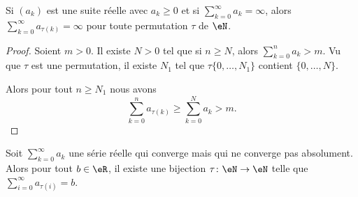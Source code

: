 \begin{proposition}	\label{PROPooVVHKooZjXQiP}
	Si \( (a_k)\) est une suite réelle avec \( a_k\geq 0\) et si \( \sum_{k=0}^{\infty}a_k=\infty\), alors \( \sum_{k=0}^{\infty}a_{\tau(k)}=\infty\) pour toute permutation \( \tau\) de \( \eN\).
\end{proposition}

\begin{proof}
	Soient \( m>0\). Il existe \( N>0\) tel que si \( n\geq N\), alors \( \sum_{k=0}^na_k>m\). Vu que \( \tau\) est une permutation, il existe \( N_1\) tel que \( \tau\{ 0,\ldots,N_1 \} \) contient \( \{ 0,\ldots,N \}\).

	Alors pour tout \( n\geq N_1\) nous avons
	\begin{equation}
		\sum_{k=0}^na_{\tau(k)}\geq \sum_{k=0}^Na_k>m.
	\end{equation}
\end{proof}

\begin{proposition}     \label{PropyFJXpr}
	Soit \( \sum_{k=0}^{\infty}a_k\) une série réelle qui converge mais qui ne converge pas absolument. Alors pour tout \( b\in \eR\), il existe une bijection \( \tau\colon \eN\to \eN\) telle que \( \sum_{i=0}^{\infty}a_{\tau(i)}=b\).
\end{proposition}

